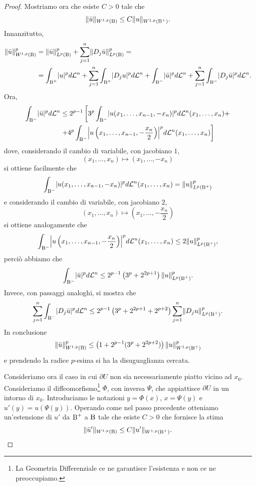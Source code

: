 \begin{proof}
	Mostriamo ora che esiste $C > 0$ tale che
	\[ \lVert\bar{u}\rVert_{W^{1,p}(\textup{B})} \le C \lVert u\rVert_{W^{1,p}(\textup{B}^+)}. \]
	Innanzitutto, 
	\begin{align*}
		\lVert\bar{u}\rVert_{W^{1,p}(\textup{B})}^p &= \lVert\bar{u}\rVert_{L^{p}(\textup{B})}^p + \sum_{j=1}^{n}\lVert D_j\bar{u}\rVert_{L^{p}(\textup{B})}^p = \\
		& = \int_{\textup{B}^+} \lvert u\rvert^p  d\mathcal{L}^n +  \sum_{j=1}^{n}\int_{\textup{B}^+}\lvert D_ju\rvert^p d\mathcal{L}^n + \int_{\textup{B}^-} \lvert\bar{u}\rvert^p  d\mathcal{L}^n +  \sum_{j=1}^{n}\int_{\textup{B}^-}\lvert D_j\bar{u}\rvert^p d\mathcal{L}^n.
	\end{align*}  
	Ora, 
	\begin{align*}
		\int_{\textup{B}^-}\abs{\bar{u}}^pd\mathcal{L}^n &\le 2^{p-1} \left[  3^p\int_{\textup{B}^-} \abs{u(x_1,\dots,x_{n-1},-x_n)}^pd\mathcal{L}^n(x_1,\dots,x_n) + \right. \\
		&\left. + 4^p\int_{\textup{B}^-} \abs*{u\left( x_1,\dots, x_{n-1},-\frac{x_n}{2}\right) }^pd\mathcal{L}^n(x_1,\dots,x_n) \right] 
	\end{align*}
	dove, considerando il cambio di variabile, con jacobiano $1$,
	\[ (x_1,\dots,x_n) \mapsto (x_1,\dots,-x_n) \]
	si ottiene facilmente che 
	\[ \int_{\textup{B}^-} \lvert u(x_1,\dots,x_{n-1},-x_n)\rvert^pd\mathcal{L}^n(x_1,\dots,x_n) = \lVert u\rVert_{L^p(\textup{B}^+)}^p \]
	e considerando il cambio di variabile, con jacobiano $2$,
	\[ 	(x_1,\dots,x_n) \mapsto \left( x_1,\dots,-\frac{x_n}{2}\right) \]
	si ottiene analogamente che
	\[ \int_{\textup{B}^-} \abs*{u\left( x_1,\dots, x_{n-1},-\frac{x_n}{2}\right) }^pd\mathcal{L}^n(x_1,\dots,x_n) \le 2\norm{u}_{L^p(\textup{B}^+)}^p, \]
	perciò abbiamo che 
	\[ 	\int_{\textup{B}^-}\lvert\bar{u}\rvert^pd\mathcal{L}^n \le 2^{p-1}\left( 3^p+2^{2p+1}\right)\lVert u\rVert_{L^p(\textup{B}^+)}^p.  \]
	Invece, con passaggi analoghi, si mostra che 
	\[ \sum_{j=1}^{n}\int_{\textup{B}^-}\lvert D_j\bar{u}\rvert^p d\mathcal{L}^n \le 2^{p-1}\left( 3^p + 2^{2p+1}+2^{p+2}\right) \sum_{j=1}^{n} \lVert D_j u\rVert_{L^p(\textup{B}^+)}^{p}. \]
	In conclusione
	\[ \lVert\bar{u}\rVert_{W^{1,p}(\textup{B})}^p \le \left( 1 + 2^{p-1}(3^{p}+2^{2p+2})\right)  \lVert u\rVert_{W^{1,p}(\textup{B}^+)}^p \]
	e prendendo la radice $p$-esima si ha la disuguaglianza cercata. 
	
	Consideriamo ora il caso in cui $\partial U$ non sia necessariamente piatto vicino ad $x_0$. Consideriamo il diffeomorfismo\footnote{La Geometria Differenziale ce ne garantisce l'esistenza e non ce ne preoccupiamo.} $\Phi$, con inversa $\Psi$, che appiattisce $\partial U$ in un intorno di $x_0$. Introduciamo le notazioni $y = \Phi(x)$, $x = \Psi(y)$ e $u'(y) = u(\Psi(y))$. Operando come nel passo precedente otteniamo un'estensione di $u'$ da $\textup{B}^+$ a $\textup{B}$ tale che esiste $C > 0 $ che fornisce la stima
	\[ \lVert\bar{u}'\rVert_{W^{1,p}(\textup{B})} \le C \lVert u'\rVert_{W^{1,p}(\textup{B}^+)}. \]
	

\end{proof}
